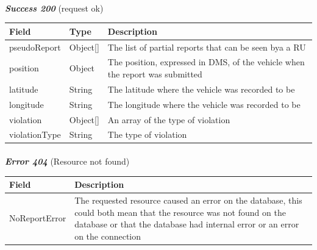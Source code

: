 						\paragraph{}
							\textit{\textbf{Success 200}} (request ok)
							\vspace{-2mm}
							\begin{table}[!h]
								\begin{tabular}{L{0.23\textwidth}L{0.15\textwidth}L{0.45\textwidth}}
									\toprule
									\textbf{Field} & \textbf{Type} & \textbf{Description} \\
									\midrule
									pseudoReport & Object[] & The list of partial reports that can be seen bya a RU \\
									\hspace{2.5mm}position & Object & The position, expressed in DMS, of the vehicle when the report was submitted  \\
									\hspace{5mm}latitude & String & The latitude where the vehicle was recorded to be \\
									\hspace{5mm}longitude & String & The longitude where the vehicle was recorded to be \\
									\hspace{2.5mm}violation & Object[] & An array of the type of violation \\
									\hspace{5mm}violationType & String & The type of violation \\
								 	\bottomrule
								\end{tabular}
							\end{table}
						\clearpage
						\paragraph{}
							\textit{\textbf{Error 404}} (Resource not found)
							\vspace{-2mm}
							\begin{table}[!h]
								\begin{tabular}{L{0.4\textwidth}L{0.4\textwidth}}
									\toprule
									\textbf{Field} & \textbf{Description} \\
									\midrule
								  	 NoReportError & The requested resource caused an error on the database, this could both mean that the resource was not found on the database or that the database had internal error or an error on the connection \\
								 	\bottomrule
								\end{tabular}
							\end{table}
						
